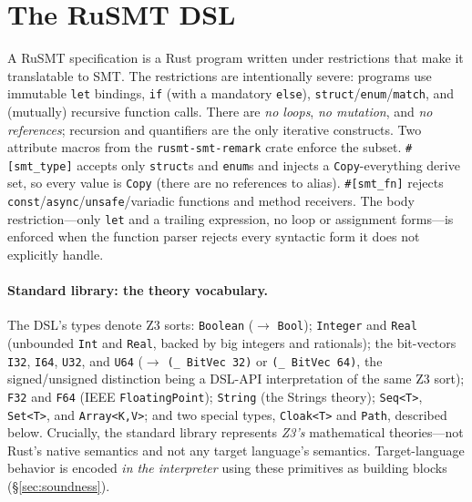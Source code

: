 \documentclass[11pt,a4paper]{article}
\theoremstyle{definition}
\theoremstyle{remark}
\newcommand{\rusmt}{RuSMT}
\newcommand{\code}[1]{\texttt{#1}}
\begin{document}
\section{The \rusmt{} DSL}
\label{sec:dsl}

A \rusmt{} specification is a Rust program written under restrictions that make
it translatable to SMT. The restrictions are intentionally severe: programs use
immutable \code{let} bindings, \code{if} (with a mandatory \code{else}),
\code{struct}/\code{enum}/\code{match}, and (mutually) recursive function calls.
There are \emph{no loops}, \emph{no mutation}, and \emph{no references}; recursion
and quantifiers are the only iterative constructs. Two attribute macros from the
\code{rusmt-smt-remark} crate enforce the subset. \code{\#[smt\_type]} accepts
only \code{struct}s and \code{enum}s and injects a \code{Copy}-everything derive
set, so every value is \code{Copy} (there are no references to alias).
\code{\#[smt\_fn]} rejects \code{const}/\code{async}/\code{unsafe}/variadic
functions and method receivers. The body restriction---only \code{let} and a
trailing expression, no loop or assignment forms---is enforced when the function
parser rejects every syntactic form it does not explicitly handle.

\paragraph{Standard library: the theory vocabulary.}
The DSL's types denote Z3 sorts: \code{Boolean} ($\to$ \code{Bool});
\code{Integer} and \code{Real} (unbounded \code{Int} and \code{Real}, backed by
big integers and rationals); the bit-vectors \code{I32}, \code{I64}, \code{U32},
and \code{U64} ($\to$ \code{(\_ BitVec 32)} or \code{(\_ BitVec 64)}, the
signed/unsigned distinction being a DSL-API interpretation of the same Z3 sort);
\code{F32} and \code{F64} (IEEE \code{FloatingPoint}); \code{String} (the Strings
theory); \code{Seq<T>}, \code{Set<T>}, and \code{Array<K,V>}; and two special
types, \code{Cloak<T>} and \code{Path}, described below. Crucially, the standard
library represents \emph{Z3's} mathematical theories---not Rust's native
semantics and not any target language's semantics. Target-language behavior is
encoded \emph{in the interpreter} using these primitives as building blocks
(\S\ref{sec:soundness}).
\end{document}
